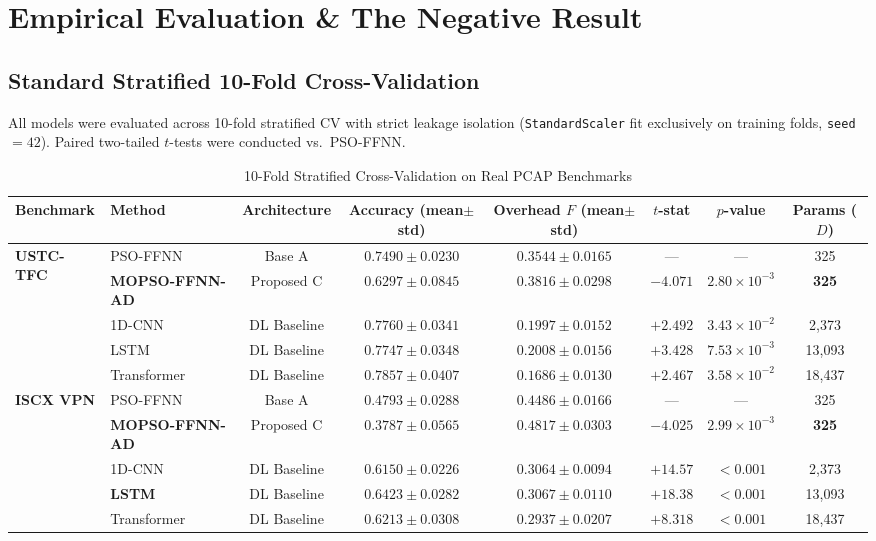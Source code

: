 \documentclass[journal]{IEEEtran}
\begin{document}
\section{Empirical Evaluation \& The Negative Result}
\label{sec:results}

\subsection{Standard Stratified 10-Fold Cross-Validation}
All models were evaluated across 10-fold stratified CV with strict leakage
isolation (\texttt{StandardScaler} fit exclusively on training folds,
\texttt{seed}$=42$). Paired two-tailed $t$-tests were conducted vs.\ PSO-FFNN.

\begin{table}[t]
\centering
\caption{10-Fold Stratified Cross-Validation on Real PCAP Benchmarks}
\label{tab:10fold}
\begin{tabular}{llcccccc}
\toprule
\textbf{Benchmark} & \textbf{Method} & \textbf{Architecture} &
\textbf{Accuracy (mean$\pm$std)} & \textbf{Overhead $F$ (mean$\pm$std)} &
\textbf{$t$-stat} & \textbf{$p$-value} & \textbf{Params ($D$)} \\
\midrule
\multirow{5}{*}{\textbf{USTC-TFC}}
 & PSO-FFNN \cite{pradhan2022}     & Base A      & $0.7490 \pm 0.0230$ & $0.3544 \pm 0.0165$ & ---      & ---                   & 325    \\
 & \textbf{MOPSO-FFNN-AD}         & Proposed C  & $0.6297 \pm 0.0845$ & $0.3816 \pm 0.0298$ & $-4.071$ & $2.80\times10^{-3}$  & \textbf{325}   \\
 & 1D-CNN                          & DL Baseline & $0.7760 \pm 0.0341$ & $0.1997 \pm 0.0152$ & $+2.492$ & $3.43\times10^{-2}$  & 2,373  \\
 & LSTM                            & DL Baseline & $0.7747 \pm 0.0348$ & $0.2008 \pm 0.0156$ & $+3.428$ & $7.53\times10^{-3}$  & 13,093 \\
 & Transformer                     & DL Baseline & $\mathbf{0.7857 \pm 0.0407}$ & $\mathbf{0.1686 \pm 0.0130}$ & $+2.467$ & $3.58\times10^{-2}$ & 18,437 \\
\midrule
\multirow{5}{*}{\textbf{ISCX VPN}}
 & PSO-FFNN \cite{pradhan2022}     & Base A      & $0.4793 \pm 0.0288$ & $0.4486 \pm 0.0166$ & ---      & ---                   & 325    \\
 & \textbf{MOPSO-FFNN-AD}         & Proposed C  & $0.3787 \pm 0.0565$ & $0.4817 \pm 0.0303$ & $-4.025$ & $2.99\times10^{-3}$  & \textbf{325}   \\
 & 1D-CNN                          & DL Baseline & $0.6150 \pm 0.0226$ & $0.3064 \pm 0.0094$ & $+14.57$ & ${<}0.001$            & 2,373  \\
 & \textbf{LSTM}                   & DL Baseline & $\mathbf{0.6423 \pm 0.0282}$ & $0.3067 \pm 0.0110$ & $+18.38$ & ${<}0.001$   & 13,093 \\
 & Transformer                     & DL Baseline & $0.6213 \pm 0.0308$ & $\mathbf{0.2937 \pm 0.0207}$ & $+8.318$ & ${<}0.001$   & 18,437 \\
\bottomrule
\end{tabular}
\end{table}
\end{document}
